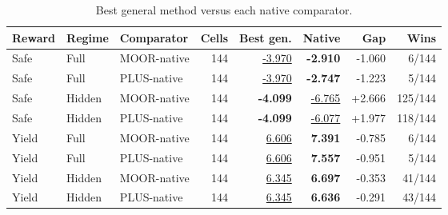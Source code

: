 \begin{table}[htbp]
\centering
\caption{Best general method versus each native comparator.}
\label{tab:native-comparison}
\begin{tabular}{lllrrrrr}
\toprule
Reward & Regime & Comparator & Cells & Best gen. & Native & Gap & Wins \\
\midrule
Safe & Full & MOOR-native & 144 & \underline{-3.970} & \textbf{-2.910} & -1.060 & 6/144 \\
Safe & Full & PLUS-native & 144 & \underline{-3.970} & \textbf{-2.747} & -1.223 & 5/144 \\
Safe & Hidden & MOOR-native & 144 & \textbf{-4.099} & \underline{-6.765} & +2.666 & 125/144 \\
Safe & Hidden & PLUS-native & 144 & \textbf{-4.099} & \underline{-6.077} & +1.977 & 118/144 \\
Yield & Full & MOOR-native & 144 & \underline{6.606} & \textbf{7.391} & -0.785 & 6/144 \\
Yield & Full & PLUS-native & 144 & \underline{6.606} & \textbf{7.557} & -0.951 & 5/144 \\
Yield & Hidden & MOOR-native & 144 & \underline{6.345} & \textbf{6.697} & -0.353 & 41/144 \\
Yield & Hidden & PLUS-native & 144 & \underline{6.345} & \textbf{6.636} & -0.291 & 43/144 \\
\bottomrule
\end{tabular}
\end{table}

